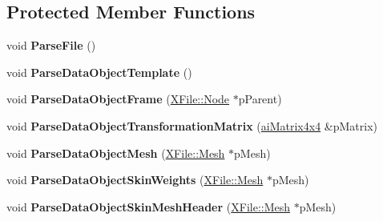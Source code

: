\subsection*{Protected Member Functions}
\begin{DoxyCompactItemize}
\item 
\hypertarget{class_assimp_1_1_x_file_parser_ac4c4075d1083dd1b4f576642309ec8cd}{void {\bfseries Parse\+File} ()}\label{class_assimp_1_1_x_file_parser_ac4c4075d1083dd1b4f576642309ec8cd}

\item 
\hypertarget{class_assimp_1_1_x_file_parser_ae5395b12ef2d48b21fa86a34c73b6d8b}{void {\bfseries Parse\+Data\+Object\+Template} ()}\label{class_assimp_1_1_x_file_parser_ae5395b12ef2d48b21fa86a34c73b6d8b}

\item 
\hypertarget{class_assimp_1_1_x_file_parser_ad06b413a962ae72d5ae42e81c49f3a74}{void {\bfseries Parse\+Data\+Object\+Frame} (\hyperlink{struct_assimp_1_1_x_file_1_1_node}{X\+File\+::\+Node} $\ast$p\+Parent)}\label{class_assimp_1_1_x_file_parser_ad06b413a962ae72d5ae42e81c49f3a74}

\item 
\hypertarget{class_assimp_1_1_x_file_parser_a7dc0bf0e605b2b88bda3b3786fc02166}{void {\bfseries Parse\+Data\+Object\+Transformation\+Matrix} (\hyperlink{structai_matrix4x4}{ai\+Matrix4x4} \&p\+Matrix)}\label{class_assimp_1_1_x_file_parser_a7dc0bf0e605b2b88bda3b3786fc02166}

\item 
\hypertarget{class_assimp_1_1_x_file_parser_ab0f17ede2e1263b2aeaa3a6813ef0568}{void {\bfseries Parse\+Data\+Object\+Mesh} (\hyperlink{struct_assimp_1_1_x_file_1_1_mesh}{X\+File\+::\+Mesh} $\ast$p\+Mesh)}\label{class_assimp_1_1_x_file_parser_ab0f17ede2e1263b2aeaa3a6813ef0568}

\item 
\hypertarget{class_assimp_1_1_x_file_parser_a9b9effc75ee2ad690f9f70d68b14083f}{void {\bfseries Parse\+Data\+Object\+Skin\+Weights} (\hyperlink{struct_assimp_1_1_x_file_1_1_mesh}{X\+File\+::\+Mesh} $\ast$p\+Mesh)}\label{class_assimp_1_1_x_file_parser_a9b9effc75ee2ad690f9f70d68b14083f}

\item 
\hypertarget{class_assimp_1_1_x_file_parser_a1e12510bad39283b3235ecd3978203b5}{void {\bfseries Parse\+Data\+Object\+Skin\+Mesh\+Header} (\hyperlink{struct_assimp_1_1_x_file_1_1_mesh}{X\+File\+::\+Mesh} $\ast$p\+Mesh)}\label{class_assimp_1_1_x_file_parser_a1e12510bad39283b3235ecd3978203b5}


\end{DoxyCompactItemize}

